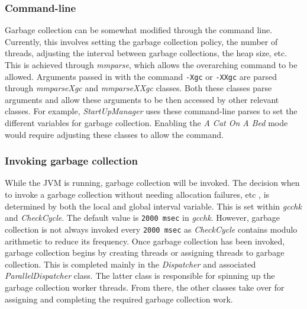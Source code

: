 \subsubsection{Command-line}
Garbage collection can be somewhat modified through the command line. Currently, this involves setting the garbage collection policy, the number of threads, adjusting the interval between garbage collections, the heap size, etc. This is achieved through \emph{mmparse}, which allows the overarching command to be allowed. Arguments passed in with the command \verb|-Xgc| or \verb|-XXgc| are parsed through \emph{mmparseXgc} and \emph{mmparseXXgc} classes. Both these classes parse arguments and allow these arguments to be then accessed by other relevant classes. For example, \emph{StartUpManager} uses these command-line parses to set the different variables for garbage collection.  Enabling the \emph{A Cat On A Bed} mode would require adjusting these classes to allow the command. 

\subsubsection{Invoking garbage collection}

While the JVM is running, garbage collection will be invoked. The decision when to invoke a garbage collection without needing allocation failures, etc , is determined by both the local and global interval variable. This is set within \emph{gcchk} and \emph{CheckCycle}. The default value is \verb|2000 msec| in \emph{gcchk}. However, garbage collection is not always invoked every \verb|2000 msec| as \emph{CheckCycle} contains modulo arithmetic to reduce its frequency. 
\newline\newline
Once garbage collection has been invoked, garbage collection begins by creating threads or assigning threads to garbage collection. This is completed mainly in the \emph{Dispatcher} and associated \emph{ParallelDispatcher} class. The latter class is responsible for spinning up the garbage collection worker threads. From there, the other classes take over for assigning and completing the required garbage collection work.
